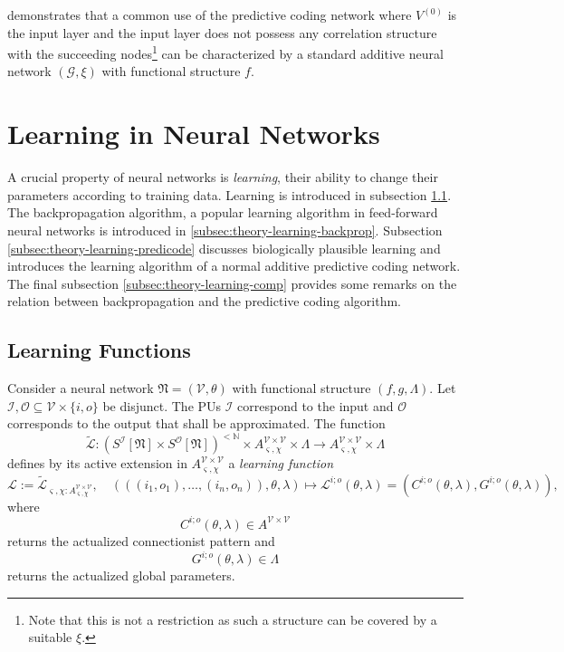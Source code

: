 \documentclass[a4paper,11pt]{report}
\newcommand{\const}{\varsigma} %
\newcommand{\var}{\chi} %
\begin{document}
\begin{Par}
 demonstrates that a common use of the predictive coding network where $V^{(0)}$ is the input layer and the input layer does not possess any correlation structure with the succeeding nodes\footnote{
Note that this is not a restriction as such a structure can be covered by a suitable $\xi$.} can be characterized by a standard additive neural network $(\mathcal{G},\xi)$ with functional structure $f$.
\end{Par}

\section{Learning in Neural Networks}\label{sec:theory-learning}

\begin{Par}
A crucial property of neural networks is \emph{learning}, their ability to change their parameters according to training data. Learning is introduced in subsection \ref{subsec:theory-learning-intro}. The backpropagation algorithm, a popular learning algorithm in feed-forward neural networks is introduced in \ref{subsec:theory-learning-backprop}. Subsection \ref{subsec:theory-learning-predicode} discusses biologically plausible learning and introduces the learning algorithm of a normal additive predictive coding network. The final subsection \ref{subsec:theory-learning-comp} provides some remarks on the relation between backpropagation and the predictive coding algorithm.
\end{Par}

\subsection{Learning Functions}\label{subsec:theory-learning-intro}

\begin{Def}
Consider a neural network $\mathfrak{N}=(\mathcal{V},\theta)$ with functional structure $(f,g,\Lambda)$. Let $\mathcal{I},\mathcal{O}\subseteq\mathcal{V}\times\{i,o\}$ be disjunct. The PUs $\mathcal{I}$ correspond to the input and $\mathcal{O}$ corresponds to the output that shall be approximated. The function
\[
\tilde{\mathcal{L}}:\left(S^{\mathcal{I}}[\mathfrak{N}]\times S^{\mathcal{O}}[\mathfrak{N}]\right)^{<\mathbb{N}}\times A^{\mathcal{V}\times\mathcal{V}}_{\const,\var}\times\Lambda\to A^{\mathcal{V}\times\mathcal{V}}_{\const,\var}\times\Lambda
\]
defines by its active extension in $A^{\mathcal{V}\times\mathcal{V}}_{\const,\var}$ a \emph{learning function}
\[
\mathcal{L}:=\tilde{\mathcal{L}}_{\const,\var:A^{\mathcal{V}\times\mathcal{V}}_{\const,\var}},
\quad
(\left((i_1,o_1),\dotsc,(i_n,o_n)\right),\theta,\lambda)\mapsto \mathcal{L}^{i;o}(\theta,\lambda)=(C^{i;o}(\theta,\lambda),G^{i;o}(\theta,\lambda)),
\]
where
\[
C^{i;o}(\theta,\lambda)\in A^{\mathcal{V}\times\mathcal{V}}
\]
returns the actualized connectionist pattern and
\[
G^{i;o}(\theta,\lambda)\in\Lambda
\]
returns the actualized global parameters.
\end{Def}
\end{document}
